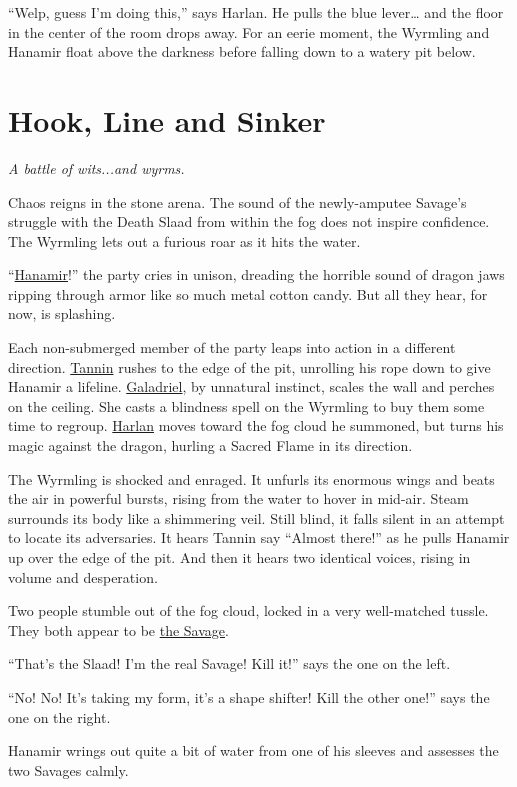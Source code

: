 \documentclass[smalldemyvopaper,11pt,twoside,onecolumn,openright,extrafontsizes]{memoir}
\newcommand{\chapdesc}[1]{
    \begin{flushright}
    \emph{{#1}}
    \end{flushright}
    \vspace{26pt}
}
\newlength\drop
\begin{document}
``Welp, guess I'm doing this,'' says Harlan. He pulls the blue
lever\ldots{} and the floor in the center of the room drops away. For an
eerie moment, the Wyrmling and Hanamir float above the darkness before
falling down to a watery pit below.


\chapter{Hook, Line and Sinker}
\chapdesc{A battle of wits...and wyrms.}

Chaos reigns in the stone arena. The sound of the newly-amputee Savage's
struggle with the Death Slaad from within the fog does not inspire
confidence. The Wyrmling lets out a furious roar as it hits the water.

``\href{/characters/hanamir/}{Hanamir}!'' the party cries in unison,
dreading the horrible sound of dragon jaws ripping through armor like so
much metal cotton candy. But all they hear, for now, is splashing.

Each non-submerged member of the party leaps into action in a different
direction. \href{/characters/tannin/}{Tannin} rushes to the edge of the
pit, unrolling his rope down to give Hanamir a lifeline.
\href{/characters/galadriel/}{Galadriel}, by unnatural instinct, scales
the wall and perches on the ceiling. She casts a blindness spell on the
Wyrmling to buy them some time to regroup.
\href{/characters/harlan/}{Harlan} moves toward the fog cloud he
summoned, but turns his magic against the dragon, hurling a Sacred Flame
in its direction.

The Wyrmling is shocked and enraged. It unfurls its enormous wings and
beats the air in powerful bursts, rising from the water to hover in
mid-air. Steam surrounds its body like a shimmering veil. Still blind,
it falls silent in an attempt to locate its adversaries. It hears Tannin
say ``Almost there!'' as he pulls Hanamir up over the edge of the pit.
And then it hears two identical voices, rising in volume and
desperation.

Two people stumble out of the fog cloud, locked in a very well-matched
tussle. They both appear to be \href{/characters/the-savage/}{the
Savage}.

``That's the Slaad! I'm the real Savage! Kill it!'' says the one on the
left.

``No! No! It's taking my form, it's a shape shifter! Kill the other
one!'' says the one on the right.

Hanamir wrings out quite a bit of water from one of his sleeves and
assesses the two Savages calmly.
\end{document}
